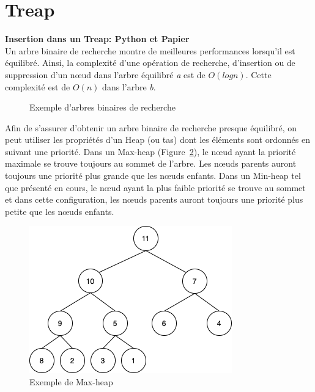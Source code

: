 \newpage
\section{Treap}
\begin{Exercice}[30 minutes]\textbf{Insertion dans un Treap: Python et Papier}\\
    Un arbre binaire de recherche montre de meilleures performances lorsqu'il est équilibré. Ainsi, la complexité d'une opération de recherche, d'insertion ou de suppression d'un nœud dans l'arbre équilibré \textit{a} est de $O(log n)$. Cette complexité est de $O(n)$ dans l'arbre \textit{b}.

    \begin{figure}[h]
        \centering
        \caption{Exemple d'arbres binaires de recherche}
        \label{fig:architecture}
    \end{figure}

    Afin de s'assurer d'obtenir un arbre binaire de recherche presque équilibré, on peut utiliser les propriétés d'un Heap (ou tas) dont les éléments sont ordonnés en suivant une priorité. Dans un Max-heap (Figure~\ref{fig:maxheap}), le nœud ayant la priorité maximale se trouve toujours au sommet de l'arbre. Les nœuds parents auront toujours une priorité plus grande que les nœuds enfants. Dans un Min-heap tel que présenté en cours, le nœud ayant la plus faible priorité se trouve au sommet et dans cette configuration, les nœuds parents auront toujours une priorité plus petite que les nœuds enfants.

    \begin{figure}[h]
        \centering
        \includegraphics[width=.38\textwidth]{resources/heap.png}
        \caption{Exemple de Max-heap}
        \label{fig:maxheap}
    \end{figure}


\end{Exercice}
